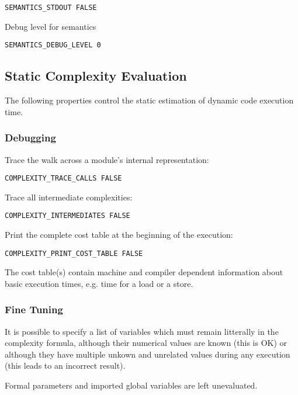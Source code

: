 \begin{verbatim}
SEMANTICS_STDOUT FALSE
\end{verbatim}

Debug level for semantics

\begin{verbatim}
SEMANTICS_DEBUG_LEVEL 0
\end{verbatim}

\subsection{Static Complexity Evaluation}

The following properties control the static estimation of dynamic code
execution time.

\subsubsection{Debugging}

Trace the walk across a module's internal representation:

\begin{verbatim}
COMPLEXITY_TRACE_CALLS FALSE
\end{verbatim}

Trace all intermediate complexities:

\begin{verbatim}
COMPLEXITY_INTERMEDIATES FALSE
\end{verbatim}

Print the complete cost table at the beginning of the execution:

\begin{verbatim}
COMPLEXITY_PRINT_COST_TABLE FALSE
\end{verbatim}

The cost table(s) contain machine and compiler dependent information
about basic execution times, e.g. time for a load or a store.

\subsubsection{Fine Tuning}

It is possible to specify a list of variables which must remain
litterally in the complexity formula, although their numerical values
are known (this is OK) or although they have multiple unkown and
unrelated values during any execution (this leads to an incorrect
result).

Formal parameters and imported global variables are left unevaluated.

